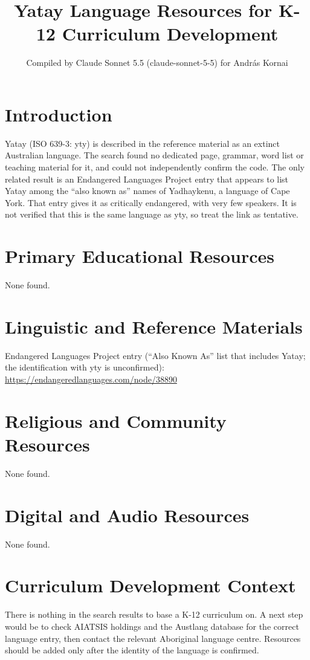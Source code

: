 \documentclass[12pt]{article}
\title{Yatay Language Resources for K-12 Curriculum Development}
\author{Compiled by Claude Sonnet 5.5 (claude-sonnet-5-5) for Andr\'as Kornai}
\date{}
\begin{document}
\maketitle

\section{Introduction}
Yatay (ISO 639-3: yty) is described in the reference material as an extinct Australian language. The search found no dedicated page, grammar, word list or teaching material for it, and could not independently confirm the code. The only related result is an Endangered Languages Project entry that appears to list Yatay among the ``also known as'' names of Yadhaykenu, a language of Cape York. That entry gives it as critically endangered, with very few speakers. It is not verified that this is the same language as yty, so treat the link as tentative.

\section{Primary Educational Resources}
None found.

\section{Linguistic and Reference Materials}
Endangered Languages Project entry (``Also Known As'' list that includes Yatay; the identification with yty is unconfirmed): \url{https://endangeredlanguages.com/node/38890}

\section{Religious and Community Resources}
None found.

\section{Digital and Audio Resources}
None found.

\section{Curriculum Development Context}
There is nothing in the search results to base a K-12 curriculum on. A next step would be to check AIATSIS holdings and the Austlang database for the correct language entry, then contact the relevant Aboriginal language centre. Resources should be added only after the identity of the language is confirmed.
\end{document}
